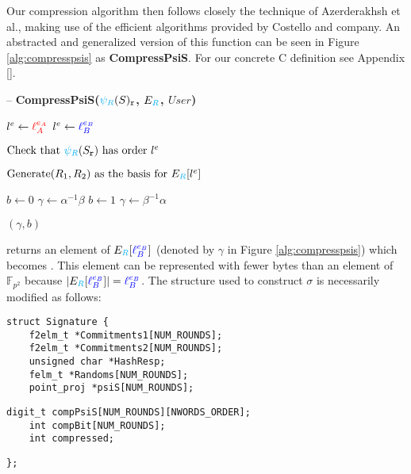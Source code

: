 Our compression algorithm then follows closely the technique of Azerderakhsh et al., making use of the efficient algorithms provided by Costello and company. An abstracted and generalized version of this function can be seen in Figure \ref{alg:compresspsis} as \textbf{CompressPsiS}. For our concrete C definition see Appendix \ref{}.

\begin{algorithm}
\caption{-- \textbf{CompressPsiS($\textcolor{cyan}{\psi_R}(S)_{\texttt{r}}$, $E_{\textcolor{cyan}{R}}$, $User$)}}
\label{alg:compresspsis}
\begin{algorithmic}[1]
	\State $l^e \gets \textcolor{red}{\ell_{A}^{e_A}}$ 
\EndIf
{}
	\State $l^e \gets \textcolor{blue}{\ell_{B}^{e_B}}$
\EndIf

\State $\text{Check that } \textcolor{cyan}{\psi_R}(S_{\texttt{r}}) \text{ has order } l^e$

\State $\text{Generate} (R_{1}, R_{2}) \text{ as the basis for } E_{\textcolor{cyan}{R}}[l^e]$

\State {}

	\State $b \gets 0$
	\State $\gamma \gets \alpha^{-1}\beta$
\Else
	\State $b \gets 1$
	\State $\gamma \gets \beta^{-1}\alpha$
\EndIf

\State \Return $(\gamma, b)$
\end{algorithmic}
\end{algorithm}

 returns an element of $E_{\textcolor{cyan}{R}}[\textcolor{blue}{\ell_{B}^{e_B}}]$ (denoted by $\gamma$ in Figure \ref{alg:compresspsis}) which becomes . This element can be represented with fewer bytes than an element of $\mathbb{F}_{p^2}$ because $\vert E_{\textcolor{cyan}{R}}[\textcolor{blue}{\ell_{B}^{e_B}}] \vert = \textcolor{blue}{\ell_{B}^{e_B}}$. The  structure used to construct $\sigma$ is necessarily modified as follows:

\begin{lstlisting}
struct Signature {
	f2elm_t *Commitments1[NUM_ROUNDS];
	f2elm_t *Commitments2[NUM_ROUNDS];
	unsigned char *HashResp;
	felm_t *Randoms[NUM_ROUNDS];
	point_proj *psiS[NUM_ROUNDS];
	\end{lstlisting}
\vspace{-0.75\baselineskip}
\begin{lstlisting}[backgroundcolor=\color{light-green}, firstnumber=7]
	digit_t compPsiS[NUM_ROUNDS][NWORDS_ORDER];
	int compBit[NUM_ROUNDS];
	int compressed;
\end{lstlisting}
\vspace{-0.75\baselineskip}
\begin{lstlisting}[firstnumber=10]
};
\end{lstlisting}
\vspace{15px}

